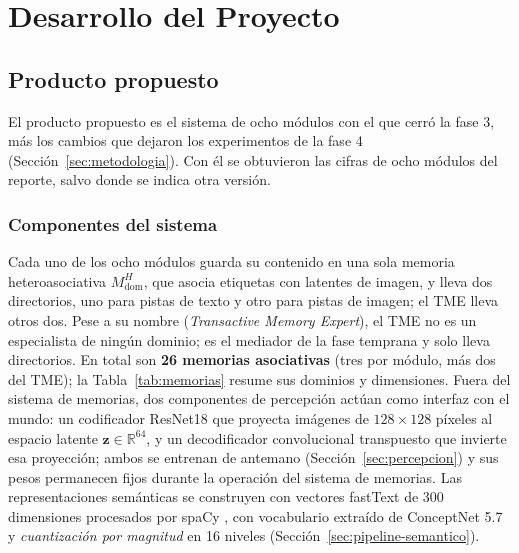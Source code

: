 \chapter{Desarrollo del Proyecto}\label{cap:desarrollo}

\section{Producto propuesto}
\label{sec:arquitectura}
El producto propuesto es el sistema de ocho módulos con el que cerró la fase 3, más los
cambios que dejaron los experimentos de la fase 4 (Sección~\ref{sec:metodologia}).
Con él se obtuvieron las cifras de ocho módulos del reporte, salvo donde se indica otra
versión.

\subsection{Componentes del sistema}
\label{sec:componentes}

Cada uno de los ocho módulos guarda su contenido en una sola memoria heteroasociativa
$M^H_{\mathrm{dom}}$, que asocia etiquetas con latentes de imagen, y lleva dos directorios,
uno para pistas de texto y otro para pistas de imagen; el TME lleva otros dos.
Pese a su nombre (\textit{Transactive Memory Expert}), el TME no es un especialista de
ningún dominio; es el mediador de la fase temprana y solo lleva directorios.
En total son \textbf{26 memorias asociativas} (tres por módulo, más dos del TME); la
Tabla~\ref{tab:memorias} resume sus dominios y dimensiones.
Fuera del sistema de memorias, dos componentes de percepción actúan como interfaz con
el mundo: un codificador ResNet18 \cite{he2016resnet} que proyecta imágenes de $128\times128$
píxeles al espacio latente $\mathbf{z} \in \mathbb{R}^{64}$, y un decodificador convolucional
transpuesto que invierte esa proyección; ambos se entrenan de antemano
(Sección~\ref{sec:percepcion}) y sus pesos permanecen fijos durante la operación del
sistema de memorias.
Las representaciones semánticas se construyen con vectores fastText de 300 dimensiones
\cite{bojanowski2017fasttext} procesados por spaCy \cite{honnibal2020spacy}, con
vocabulario extraído de ConceptNet 5.7 \cite{speer2017conceptnet} y
\emph{cuantización por magnitud} en 16 niveles (Sección~\ref{sec:pipeline-semantico}).

